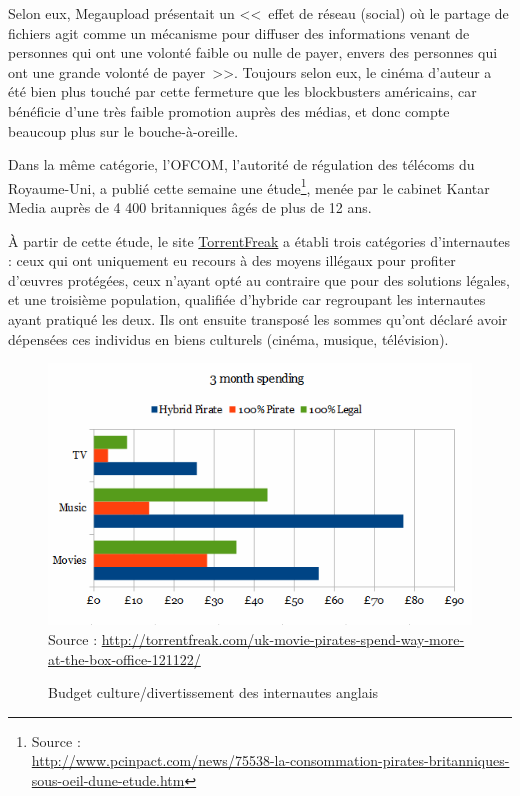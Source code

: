 Selon eux, Megaupload présentait un <<~effet de réseau (social) où le partage de fichiers agit comme un mécanisme pour diffuser des informations venant de personnes qui ont une volonté faible ou nulle de payer, envers des personnes qui ont une grande volonté de payer~>>.
Toujours selon eux, le cinéma d'auteur a été bien plus touché par cette fermeture que les blockbusters américains, car bénéficie d'une très faible promotion auprès des médias, et donc compte beaucoup plus sur le bouche-à-oreille.

Dans la même catégorie, l'OFCOM, l'autorité de régulation des télécoms du Royaume-Uni, a publié cette semaine une étude\footnote{Source :\\\url{http://www.pcinpact.com/news/75538-la-consommation-pirates-britanniques-sous-oeil-dune-etude.htm}}, menée par le cabinet Kantar Media auprès de 4 400 britanniques âgés de plus de 12 ans.

À partir de cette étude, le site \href{http://torrentfreak.com/uk-movie-pirates-spend-way-more-at-the-box-office-121122/}{TorrentFreak} a établi trois catégories d'internautes : ceux qui ont uniquement eu recours à des moyens illégaux pour profiter d'œuvres protégées, ceux n'ayant opté au contraire que pour des solutions légales, et une troisième population, qualifiée d'hybride car regroupant les internautes ayant pratiqué les deux.
Ils ont ensuite transposé les sommes qu'ont déclaré avoir dépensées ces individus en biens culturels (cinéma, musique, télévision).

\begin{figure}[H]
\center
\includegraphics[width=\textwidth]{images/budget-culture.png}
{\footnotesize Source : \url{http://torrentfreak.com/uk-movie-pirates-spend-way-more-at-the-box-office-121122/}}
\caption{Budget culture/divertissement des internautes anglais}
\end{figure}

